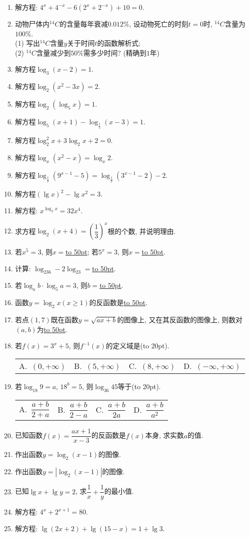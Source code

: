 \documentclass[10pt,a4paper]{article}
\newcommand{\blank}[1]{\underline{\hbox to #1pt{}}}
\newcommand{\bracket}[1]{(\hbox to #1pt{})}
\newcommand{\fourch}[4]{\par\begin{tabular}{p{.23\textwidth}p{.23\textwidth}p{.23\textwidth}p{.23\textwidth}}
A.~#1 &B.~#2& C.~#3& D.~#4
\end{tabular}}
\begin{document}
\begin{enumerate}[1.]
\item 解方程: $4^x+4^{-x}-6(2^x+2^{-x})+10=0$.
\item 动物尸体内$^{14}C$的含量每年衰减$0.012\%$, 设动物死亡的时刻$t=0$时, $^{14}C$含量为$100\%$.\\
(1) 写出$^{14}C$含量$y$关于时间$t$的函数解析式;\\
(2) $^{14}C$含量减少到$50\%$需多少时间? (精确到$1$年)
\item 解方程$\log _3(x-2)=1$.
\item 解方程$\log _2(x^2-3x)=2$.
\item 解方程$\log _2(\log _5x)=1$.
\item 解方程$\log _5(x+1)-\log _{\frac 15}(x-3)=1$.
\item 解方程$\log _2^2x+3\log _2x+2=0$.
\item 解方程$\log _x(x^2-x)=\log _x2$.
\item 解方程$\log _{\frac 12}(9^{x-1}-5)=\log _{\frac 12}(3^{x-1}-2)-2$.
\item 解方程$(\lg x)^2-\lg x^2=3$.
\item 解方程: $x^{\log _2x}=32x^4$.
\item 求方程$\log _2(x+4)=(\dfrac 13)^x$根的个数, 并说明理由.
\item 若$x^5=3$, 则$x=$\blank{50}; 若$5^x=3$, 则$x=$\blank{50}.
\item 计算: $\log _236-2\log _23=$\blank{50}.
\item 若$\log _ab\cdot \log _5a=3$, 则$b=$\blank{50}.
\item 函数$y=\log _2x(x\ge 1)$的反函数是\blank{50}.
\item 若点$(1, 7)$既在函数$y=\sqrt {ax+b}$的图像上, 又在其反函数的图像上, 则数对$(a,b)$为\blank{50}.
\item 若$f(x)=3^x+5$, 则$f^{-1}(x)$的定义域是\bracket{20}.
\fourch{$(0,+\infty)$}{$(5,+\infty)$}{$(8,+\infty)$}{$(-\infty ,+\infty)$}
\item 若$\log _{18}9=a$, $18^b=5$, 则$\log _{36}45$等于\bracket{20}.
\fourch{$\dfrac{a+b}{2+a}$}{$\dfrac{a+b}{2-a}$}{$\dfrac{a+b}{2a}$}{$\dfrac{a+b}{a^2}$}
\item 已知函数$f(x)=\dfrac{ax+1}{x-3}$的反函数是$f(x)$本身, 求实数$a$的值.
\item 作出函数$y=\log _2(x-1)$的图像.
\item 作出函数$y=|\log _2(x-1)|$的图像.
\item 已知$\lg x+\lg y=2$, 求$\dfrac 1x+\dfrac 1y$的最小值.
\item 解方程: $4^x+2^{x+1}=80$.
\item 解方程: $\lg (2x+2)+\lg (15-x)=1+\lg 3$.

\end{enumerate}
\end{document}
